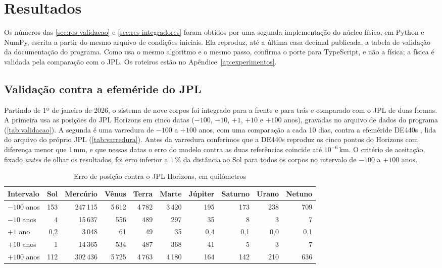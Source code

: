 \section{Resultados}\label{cap:resultados}

Os números das \autoref{sec:res-validacao} e \ref{sec:res-integradores} foram obtidos por uma segunda implementação do núcleo físico, em Python e NumPy, escrita a partir do mesmo arquivo de condições iniciais. Ela reproduz, até a última casa decimal publicada, a tabela de validação da documentação do programa. Como usa o mesmo algoritmo e o mesmo passo, confirma o porte para TypeScript, e não a física; a física é validada pela comparação com o JPL. Os roteiros estão no Apêndice~\ref{ap:experimentos}.

\subsection{Validação contra a efeméride do JPL}\label{sec:res-validacao}

Partindo de 1º de janeiro de 2026, o sistema de nove corpos foi integrado para a frente e para trás e comparado com o JPL de duas formas. A primeira usa as posições do JPL Horizons em cinco datas ($-100$, $-10$, $+1$, $+10$ e $+100$ anos), gravadas no arquivo de dados do programa (\autoref{tab:validacao}). A segunda é uma varredura de $-100$ a $+100$ anos, com uma comparação a cada 10 dias, contra a efeméride DE440s \cite{park2021}, lida do arquivo do próprio JPL (\autoref{tab:varredura}). Antes da varredura conferimos que a DE440s reproduz os cinco pontos do Horizons com diferença menor que 1\,mm, e que nessas datas o erro do modelo contra as duas referências coincide até $10^{-6}$\,km. O critério de aceitação, fixado \emph{antes} de olhar os resultados, foi erro inferior a 1\,\% da distância ao Sol para todos os corpos no intervalo de $-100$ a $+100$ anos.

\begin{table}[htb]
  \centering
  \caption{Erro de posição contra o JPL Horizons, em quilômetros}
  \label{tab:validacao}
  \small
  \setlength{\tabcolsep}{4pt}
  \begin{tabular}{lrrrrrrrrr}
    \toprule
    Intervalo & Sol & Mercúrio & Vênus & Terra & Marte & Júpiter & Saturno & Urano & Netuno \\
    \midrule
    $-100$ anos & 153 & 247\,115 & 5\,612 & 4\,782 & 3\,420 & 195 & 173 & 238 & 709 \\
    $-10$ anos  & 4   & 15\,637  & 556    & 489    & 297    & 35  & 8   & 3   & 7 \\
    $+1$ ano    & 0,2 & 3\,048   & 61     & 49     & 35     & 0,4 & 0,1 & 0,0 & 0,1 \\
    $+10$ anos  & 1   & 14\,365  & 534    & 487    & 368    & 41  & 5   & 3   & 7 \\
    $+100$ anos & 112 & 302\,436 & 5\,725 & 4\,763 & 4\,180 & 164 & 142 & 210 & 636 \\
    \bottomrule
  \end{tabular}
\end{table}

